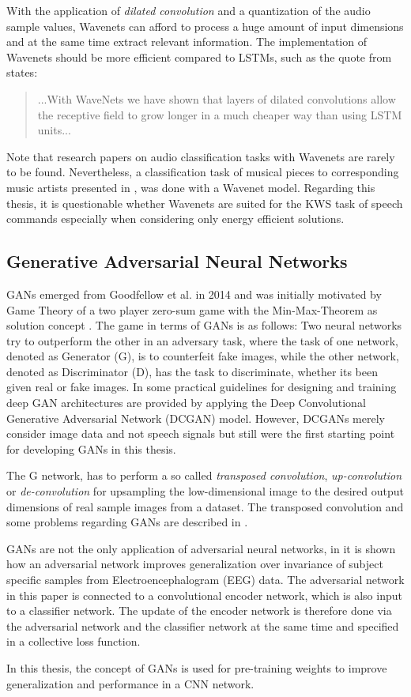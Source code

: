 With the application of \emph{dilated convolution} and a quantization of the audio sample values, Wavenets can afford to process a huge amount of input dimensions and at the same time extract relevant information.
The implementation of Wavenets should be more efficient compared to LSTMs, such as the quote from \cite{Oord2016} states:
\begin{quote}
  ...With WaveNets we have shown that layers of dilated convolutions allow the receptive field to grow longer in a much cheaper way than using LSTM units...
\end{quote}
Note that research papers on audio classification tasks with Wavenets are rarely to be found.
Nevertheless, a classification task of musical pieces to corresponding music artists presented in \cite{Zhang2020}, was done with a Wavenet model.
Regarding this thesis, it is questionable whether Wavenets are suited for the KWS task of speech commands especially when considering only energy efficient solutions.



\subsection{Generative Adversarial Neural Networks}\label{sec:prev_nn_adv}
GANs emerged from Goodfellow et al. in 2014 \cite{Goodfellow2014} and was initially motivated by Game Theory of a two player zero-sum game with the Min-Max-Theorem as solution concept \cite{VonNeumann1944}.
The game in terms of GANs is as follows: Two neural networks try to outperform the other in an adversary task, where the task of one network, denoted as Generator (G), is to counterfeit fake images, while the other network, denoted as Discriminator (D), has the task to discriminate, whether its been given real or fake images.
In \cite{Radford2016} some practical guidelines for designing and training deep GAN architectures are provided by applying the Deep Convolutional Generative Adversarial Network (DCGAN) model.
However, DCGANs merely consider image data and not speech signals but still were the first starting point for developing GANs in this thesis.

The G network, has to perform a so called \emph{transposed convolution}, \emph{up-convolution} or \emph{de-convolution} for upsampling the low-dimensional image to the desired output dimensions of real sample images from a dataset.
The transposed convolution and some problems regarding GANs are described in \cite{Durall2020}.

GANs are not the only application of adversarial neural networks, in \cite{Oezdenizci2020} it is shown how an adversarial network improves generalization over invariance of subject specific samples from Electroencephalogram (EEG) data.
The adversarial network in this paper is connected to a convolutional encoder network, which is also input to a classifier network.
The update of the encoder network is therefore done via the adversarial network and the classifier network at the same time and specified in a collective loss function.

In this thesis, the concept of GANs is used for pre-training weights to improve generalization and performance in a CNN network.